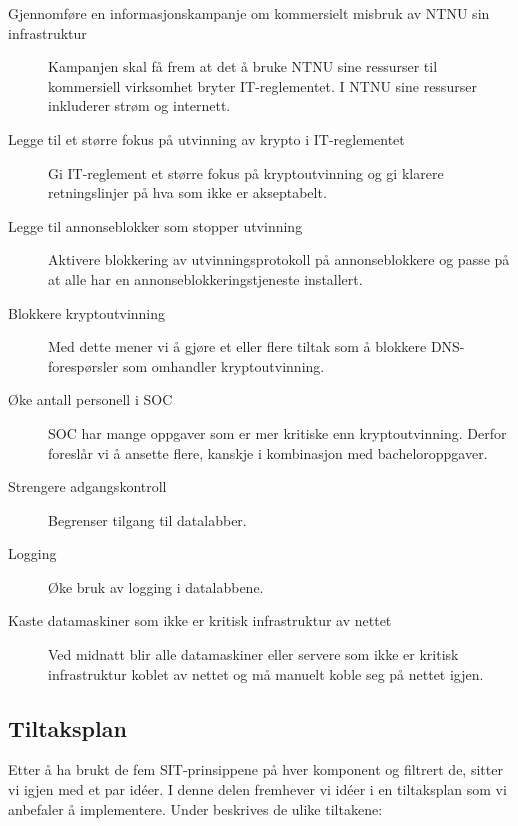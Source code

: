 \begin{description}
\item[Gjennomføre en informasjonskampanje om kommersielt misbruk av NTNU sin infrastruktur] Kampanjen skal få frem at det å bruke NTNU sine ressurser til kommersiell virksomhet bryter IT-reglementet. I NTNU sine ressurser inkluderer strøm og internett. %
\item[Legge til et større fokus på utvinning av krypto i IT-reglementet] Gi IT-reglement et større fokus på kryptoutvinning og gi klarere retningslinjer på hva som ikke er akseptabelt.
\item[Legge til annonseblokker som stopper utvinning] Aktivere blokkering av utvinningsprotokoll på annonseblokkere og passe på at alle har en annonseblokkeringstjeneste installert.
\item[Blokkere kryptoutvinning] Med dette mener vi å gjøre et eller flere tiltak som å blokkere DNS-forespørsler som omhandler kryptoutvinning.  
\item[Øke antall personell i SOC] SOC har mange oppgaver som er mer kritiske enn kryptoutvinning. Derfor foreslår vi å ansette flere, kanskje i kombinasjon med bacheloroppgaver.
\item[Strengere adgangskontroll] Begrenser tilgang til datalabber. 
\item[Logging] Øke bruk av logging i datalabbene. 
\item[Kaste datamaskiner som ikke er kritisk infrastruktur av nettet] Ved midnatt blir alle datamaskiner eller servere som ikke er kritisk infrastruktur koblet av nettet og må manuelt koble seg på nettet igjen.
\end{description}

\subsection{Tiltaksplan}
Etter å ha brukt de fem SIT-prinsippene på hver komponent og filtrert de, sitter vi igjen med et par idéer. I denne delen fremhever vi idéer i en tiltaksplan som vi anbefaler å implementere. 
Under beskrives de ulike tiltakene:

